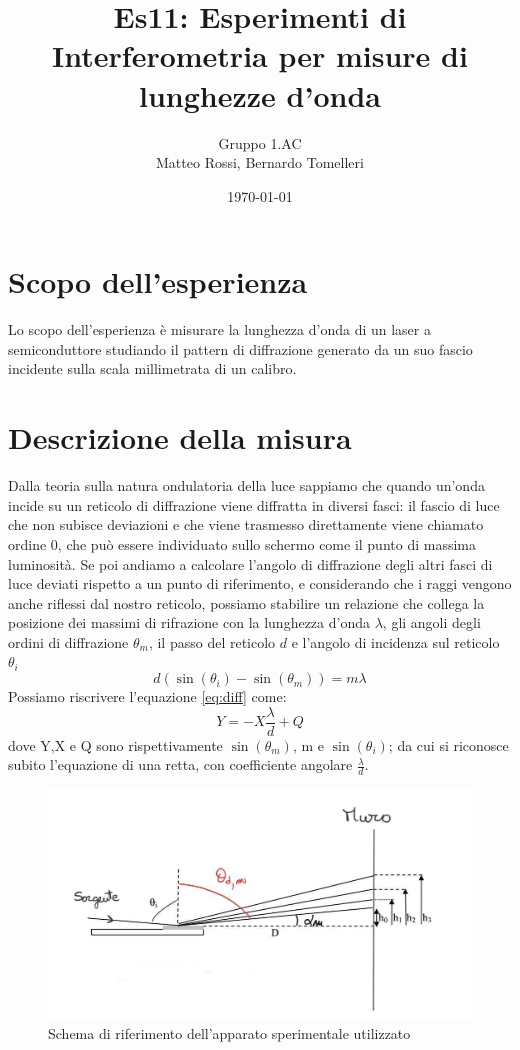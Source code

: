 \documentclass[10pt, a4paper, italian]{article}
\author{Gruppo 1.AC \\ Matteo Rossi, Bernardo Tomelleri}
\title{Es11: Esperimenti di Interferometria per misure di lunghezze d'onda}
\begin{document}
\date{\today}
\maketitle

\section{Scopo dell'esperienza}
Lo scopo dell'esperienza è misurare la lunghezza d'onda di un laser
a semiconduttore studiando il pattern di diffrazione generato da un suo
fascio incidente sulla scala millimetrata di un calibro.

\section{Descrizione della misura}
Dalla teoria sulla natura ondulatoria della luce sappiamo che quando un'onda incide su un reticolo di diffrazione viene diffratta in diversi fasci: il fascio di luce che non subisce deviazioni e che viene trasmesso direttamente viene chiamato ordine 0, che può essere individuato sullo schermo come il punto di massima luminosità. Se poi andiamo a calcolare l'angolo di diffrazione degli altri fasci di luce deviati rispetto a un punto di riferimento, e considerando che i raggi vengono anche riflessi dal nostro reticolo, possiamo stabilire un relazione che collega la posizione dei massimi di rifrazione con la lunghezza d'onda $\lambda$, gli angoli degli ordini di diffrazione $\theta _m$, il passo del reticolo $d$ e l'angolo di incidenza sul reticolo $\theta _i$
\begin{equation}
d(\sin(\theta _i) - \sin(\theta _m))=m \lambda
\label{eq:diff}
\end{equation}
Possiamo riscrivere l'equazione \ref{eq:diff} come:
\begin{equation}
Y= -X \frac{\lambda}{d} +Q
\label{eq:fit}
\end{equation}
dove Y,X e Q sono rispettivamente $\sin(\theta _m)$, m e $\sin(\theta _i)$; da cui si riconosce subito l'equazione di una retta, con coefficiente angolare $\frac{\lambda}{d}$.
\begin{figure}
\includegraphics[width=\textwidth]{0}
\caption{ \label{schema1} Schema di riferimento dell'apparato sperimentale utilizzato}
\end{figure}
\end{document}
